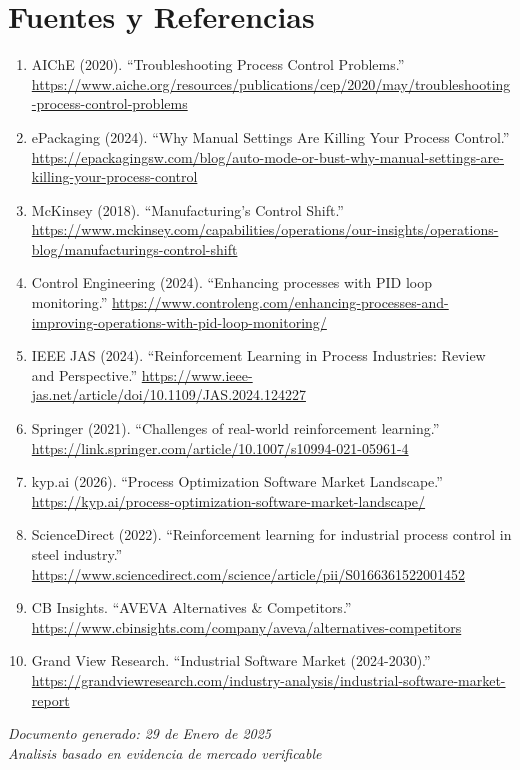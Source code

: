 \documentclass[11pt,a4paper]{article}
\begin{document}
\newpage
\section*{Fuentes y Referencias}

\begin{enumerate}[leftmargin=*]
    \item AIChE (2020). ``Troubleshooting Process Control Problems.'' \url{https://www.aiche.org/resources/publications/cep/2020/may/troubleshooting-process-control-problems}
    
    \item ePackaging (2024). ``Why Manual Settings Are Killing Your Process Control.'' \url{https://epackagingsw.com/blog/auto-mode-or-bust-why-manual-settings-are-killing-your-process-control}
    
    \item McKinsey (2018). ``Manufacturing's Control Shift.'' \url{https://www.mckinsey.com/capabilities/operations/our-insights/operations-blog/manufacturings-control-shift}
    
    \item Control Engineering (2024). ``Enhancing processes with PID loop monitoring.'' \url{https://www.controleng.com/enhancing-processes-and-improving-operations-with-pid-loop-monitoring/}
    
    \item IEEE JAS (2024). ``Reinforcement Learning in Process Industries: Review and Perspective.'' \url{https://www.ieee-jas.net/article/doi/10.1109/JAS.2024.124227}
    
    \item Springer (2021). ``Challenges of real-world reinforcement learning.'' \url{https://link.springer.com/article/10.1007/s10994-021-05961-4}
    
    \item kyp.ai (2026). ``Process Optimization Software Market Landscape.'' \url{https://kyp.ai/process-optimization-software-market-landscape/}
    
    \item ScienceDirect (2022). ``Reinforcement learning for industrial process control in steel industry.'' \url{https://www.sciencedirect.com/science/article/pii/S0166361522001452}
    
    \item CB Insights. ``AVEVA Alternatives \& Competitors.'' \url{https://www.cbinsights.com/company/aveva/alternatives-competitors}
    
    \item Grand View Research. ``Industrial Software Market (2024-2030).'' \url{https://grandviewresearch.com/industry-analysis/industrial-software-market-report}
\end{enumerate}

\vfill
\begin{center}
\textit{Documento generado: 29 de Enero de 2025}\\
\textit{Analisis basado en evidencia de mercado verificable}
\end{center}
\end{document}
